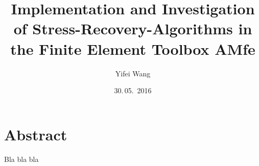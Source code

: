 \documentclass[nenglish]{AMsemesterArbeit}
\author{Yifei Wang}
\title{%
	Implementation and Investigation of Stress-Recovery-Algorithms in the Finite Element Toolbox AMfe
	}
\date{30.\,05.~2016}
\begin{document}
\renewcommand{\arraystretch}{2}
\frontmatter
\maketitle
\section*{Abstract}
Bla bla bla

\PrintTablesAndListsOfContents
\mainmatter

\backmatter
\AMPrintBibliography
\end{document}
